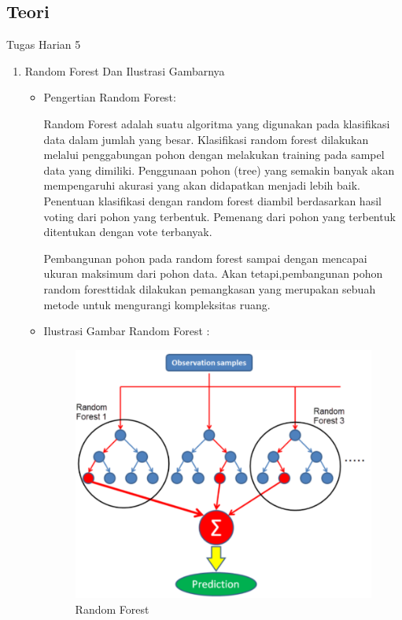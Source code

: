 \subsection{Teori}
Tugas Harian 5 
\begin{enumerate}
\item Random Forest Dan Ilustrasi Gambarnya
\begin{itemize}
\item Pengertian Random Forest:
\par Random Forest adalah suatu algoritma yang digunakan pada klasifikasi data dalam jumlah yang besar. Klasifikasi random forest dilakukan melalui penggabungan pohon  dengan melakukan training pada sampel data yang dimiliki. Penggunaan pohon (tree) yang semakin banyak akan mempengaruhi akurasi yang akan didapatkan menjadi lebih baik. Penentuan klasifikasi dengan random forest diambil berdasarkan hasil voting dari pohon yang terbentuk. Pemenang dari pohon yang terbentuk ditentukan dengan vote terbanyak. 
\par Pembangunan pohon  pada random forest sampai dengan mencapai ukuran maksimum dari pohon data. Akan tetapi,pembangunan pohon random foresttidak dilakukan pemangkasan  yang merupakan sebuah metode untuk mengurangi kompleksitas ruang.
\item Ilustrasi Gambar Random Forest :
\par

\begin{figure}[ht]
\centering
\includegraphics[scale=0.9]{figures/AIP/asm1.PNG}
\caption{Random Forest}
\label{contoh}
\end{figure}


\end{itemize}
\end{enumerate}
